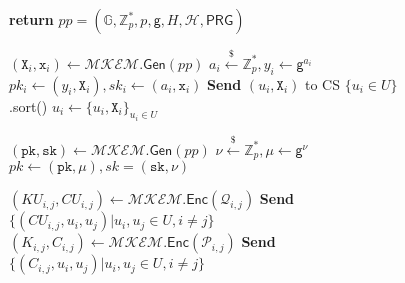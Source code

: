 
\begin{figure}
    \begin{mdframed}
    \begin{multicols}{2}
        \begin{algorithmic}[1] %
            \scriptsize
                 \textcolor{blue}{}
                    \State \textbf{return} $pp = (\mathbb{G}, \mathbb{Z}^{*}_{p}, p, \mathsf{g}, H, \mathcal{H}, \mathsf{PRG})$
                \EndWhile
                \Statex
                
                 \textcolor{blue}{}
                     
                        \State $(\mathtt{X}_{i}, \mathtt{x}_{i}) \leftarrow \mathcal{MKEM}.\mathsf{Gen}(pp)$
                        \State $a_i \overset{\$}{\leftarrow} \mathbb{Z}^{*}_{p}, y_i \leftarrow \mathsf{g}^{a_i}$
                        \State $pk_i \leftarrow (y_i, \mathtt{X}_{i}), sk_i \leftarrow (a_i, \mathtt{x}_{i})$
                        \State \textbf{Send} $( u_i, \mathtt{X}_{i} )$ to CS
                    \EndFor
                      
                        \State $\{u_i \in U\}$.sort()
                        \State $u_i \leftarrow \{ u_i, \mathtt{X}_{i} \}_{u_i \in U}$
                    \EndIf
                \EndWhile
                \Statex
                
                 \textcolor{blue}{}
                    \State $(\mathtt{pk}, \mathtt{sk}) \leftarrow \mathcal{MKEM}.\mathsf{Gen}(pp)$ 
                    \State $\nu \overset{\$}{\leftarrow} \mathbb{Z}^{*}_{p},  \mu \leftarrow \mathsf{g}^{\nu}$
                    \State $pk \leftarrow (\mathtt{pk}, \mu), sk = (\mathtt{sk}, \nu)$
                \EndWhile
                \Statex
                
                 \textcolor{blue}{}
                     
                            \State $(KU_{i,j}, CU_{i,j}) \leftarrow \mathcal{MKEM}.\mathsf{Enc}(\mathcal{Q}_{i,j})$
                            \State \textbf{Send} $\{(CU_{i,j}, u_i, u_j) | u_{i}, u_{j} \in U , i \neq j\}$
                        \EndFor
                    \EndFor
                     
                            \State $(K_{i,j}, C_{i,j}) \leftarrow \mathcal{MKEM}.\mathsf{Enc}(\mathcal{P}_{i,j})$
                            \State \textbf{Send} $\{(C_{i,j}, u_i, u_j) | u_{i}, u_{j} \in U , i \neq j\}$
                        \EndFor
                    \EndFor
                \EndWhile
                \Statex
                

\end{algorithmic}
\end{multicols}
\end{mdframed}
\end{figure}
